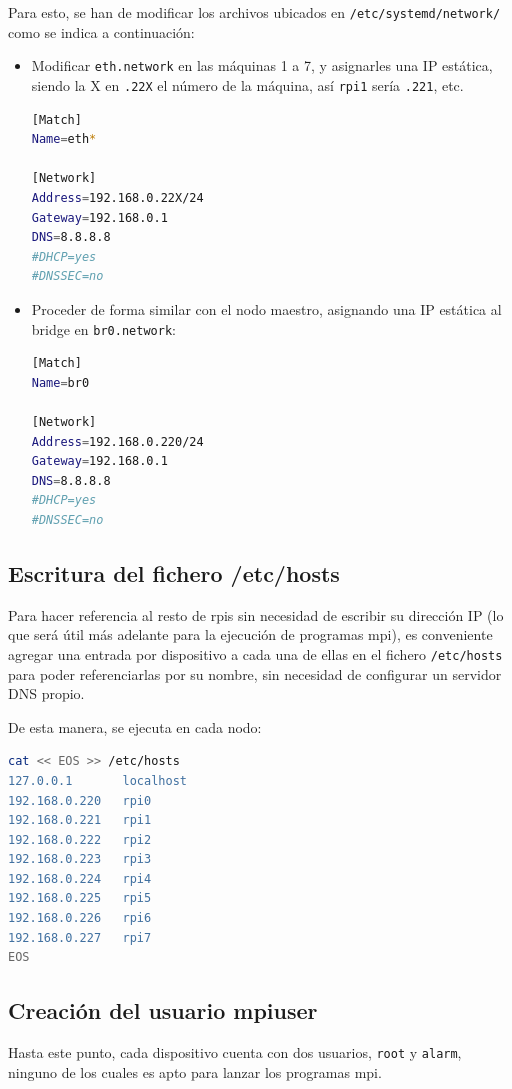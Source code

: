 Para esto, se han de modificar los archivos ubicados en \texttt{/etc/systemd/network/} como se indica a continuación:

\begin{itemize}
    \item Modificar \texttt{eth.network} en las máquinas 1 a 7, y asignarles una IP estática, siendo la X en \texttt{.22X} el número de la máquina, así \texttt{rpi1} sería \texttt{.221}, etc.
\begin{lstlisting}[language=bash]
[Match]
Name=eth*

[Network]
Address=192.168.0.22X/24
Gateway=192.168.0.1
DNS=8.8.8.8
#DHCP=yes
#DNSSEC=no
\end{lstlisting}
    \item Proceder de forma similar con el nodo maestro, asignando una IP estática al bridge en \texttt{br0.network}:
\begin{lstlisting}[language=bash]
[Match]
Name=br0

[Network]
Address=192.168.0.220/24
Gateway=192.168.0.1
DNS=8.8.8.8
#DHCP=yes
#DNSSEC=no
\end{lstlisting}
\end{itemize}

\subsection{Escritura del fichero /etc/hosts}
Para hacer referencia al resto de \acrshort{rpi}s sin necesidad de escribir su dirección IP (lo que será útil más adelante para la ejecución de programas \acrshort{mpi}), es conveniente agregar una entrada por dispositivo a cada una de ellas en el fichero \texttt{/etc/hosts} para poder referenciarlas por su nombre, sin necesidad de configurar un servidor DNS propio.

De esta manera, se ejecuta en cada nodo:
\begin{lstlisting}[language=bash]
cat << EOS >> /etc/hosts
127.0.0.1       localhost
192.168.0.220   rpi0
192.168.0.221   rpi1
192.168.0.222   rpi2
192.168.0.223   rpi3
192.168.0.224   rpi4
192.168.0.225   rpi5
192.168.0.226   rpi6
192.168.0.227   rpi7
EOS
\end{lstlisting}

\subsection{Creación del usuario mpiuser}
Hasta este punto, cada dispositivo cuenta con dos usuarios, \texttt{root} y \texttt{alarm}, ninguno de los cuales es apto para lanzar los programas \acrshort{mpi}.

